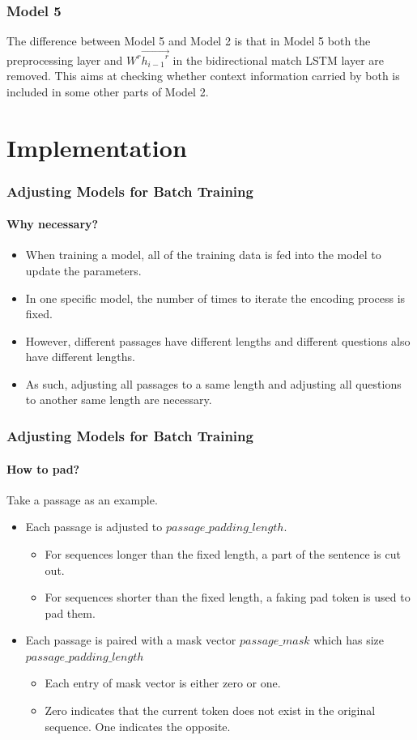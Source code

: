 \documentclass{beamer}
\begin{document}
\begin{frame} \frametitle{Model 5}
    The difference between Model 5 and Model 2 is that in Model 5 both the preprocessing layer and $W^r\overrightarrow{{h_{i-1}}^r}$ in the bidirectional match LSTM layer are removed. This aims at checking whether context information carried by both is included in some other parts of Model 2.
\end{frame}

\section{Implementation}

\begin{frame} \frametitle{Adjusting Models for Batch Training}\framesubtitle{Why necessary?}
    \begin{itemize}
        \item When training a model, all of the training data is fed into the model to update the parameters.
        \item In one specific model, the number of times to iterate the encoding process is fixed.
        \item However, different passages have different lengths and different questions also have different lengths.
        \item As such, adjusting all passages to a same length and adjusting all questions to another same length are necessary.
    \end{itemize}
\end{frame}

\begin{frame}\frametitle{Adjusting Models for Batch Training}\framesubtitle{How to pad?}
Take a passage as an example.
    \begin{itemize}
        \item Each passage is adjusted to $passage\_padding\_length$.
            \begin{itemize}
                \item For sequences longer than the fixed length, a part of the sentence is cut out.
                \item For sequences shorter than the fixed length, a faking pad token is used to pad them.
            \end{itemize}
        \item Each passage is paired with a mask vector $passage\_mask$ which has size $passage\_padding\_length$
            \begin{itemize}
                \item Each entry of mask vector is either zero or one. \item Zero indicates that the current token does not exist in the original sequence. One indicates the opposite.
            \end{itemize}
    \end{itemize}
\end{frame}
\end{document}
